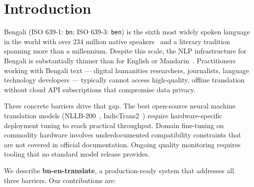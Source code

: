 \documentclass[conference]{IEEEtran}
\begin{document}
\section{Introduction}

Bengali (ISO 639-1: \texttt{bn}; ISO 639-3: \texttt{ben}) is the sixth most widely
spoken language in the world with over 234 million native speakers~\cite{ethnologue2023}
and a literary tradition spanning more than a millennium.
Despite this scale, the NLP infrastructure for Bengali is substantially thinner than
for English or Mandarin~\cite{hasan2020xl}.
Practitioners working with Bengali text --- digital humanities researchers,
journalists, language technology developers --- typically cannot access high-quality,
offline translation without cloud API subscriptions that compromise data privacy.

Three concrete barriers drive that gap. The best open-source neural machine translation
models (NLLB-200~\cite{nllb2022}, IndicTrans2~\cite{gala2023indictrans2}) require
hardware-specific deployment tuning to reach practical throughput.
Domain fine-tuning on commodity hardware involves underdocumented compatibility
constraints that are not covered in official documentation.
Ongoing quality monitoring requires tooling that no standard model release provides.

We describe \textbf{bn-en-translate}, a production-ready system that addresses all
three barriers. Our contributions are:
\end{document}
